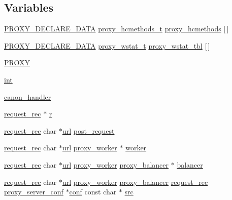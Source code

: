 \subsection*{Variables}
\begin{DoxyCompactItemize}
\item 
\hyperlink{group__MOD__PROXY_ga0446e2d44d50898071a7dcb4fd9172b0}{P\+R\+O\+X\+Y\+\_\+\+D\+E\+C\+L\+A\+R\+E\+\_\+\+D\+A\+TA} \hyperlink{structproxy__hcmethods__t}{proxy\+\_\+hcmethods\+\_\+t} \hyperlink{group__MOD__PROXY_gaaf461fe67b2fa7c8dd2f5ed1313fe46f}{proxy\+\_\+hcmethods} \mbox{[}$\,$\mbox{]}
\item 
\hyperlink{group__MOD__PROXY_ga0446e2d44d50898071a7dcb4fd9172b0}{P\+R\+O\+X\+Y\+\_\+\+D\+E\+C\+L\+A\+R\+E\+\_\+\+D\+A\+TA} \hyperlink{structproxy__wstat__t}{proxy\+\_\+wstat\+\_\+t} \hyperlink{group__MOD__PROXY_ga1077b97180eb36b606215d0625e0cfa0}{proxy\+\_\+wstat\+\_\+tbl} \mbox{[}$\,$\mbox{]}
\item 
\hyperlink{group__MOD__PROXY_ga8a2d0523d70a5ec877fe8d89ef4ecd96}{P\+R\+O\+XY}
\item 
\hyperlink{group__MOD__PROXY_ga1737d9ec131b6c1a095e69a2a6e95f41}{int}
\item 
\hyperlink{group__MOD__PROXY_gae1b959459c672856e6ddbe5c4516c7f0}{canon\+\_\+handler}
\item 
\hyperlink{structrequest__rec}{request\+\_\+rec} $\ast$ \hyperlink{group__MOD__PROXY_gac68e921ed15f71060d618adb662a84f6}{r}
\item 
\hyperlink{structrequest__rec}{request\+\_\+rec} char $\ast$\hyperlink{group__APR__Util__Escaping_gaec657bef26e5ff27b9442563a591d9ec}{url} \hyperlink{group__MOD__PROXY_ga16dfddd69e577bde0530baf5fb180cc2}{post\+\_\+request}
\item 
\hyperlink{structrequest__rec}{request\+\_\+rec} char $\ast$\hyperlink{group__APR__Util__Escaping_gaec657bef26e5ff27b9442563a591d9ec}{url} \hyperlink{structproxy__worker}{proxy\+\_\+worker} $\ast$ \hyperlink{group__MOD__PROXY_gad62a732febc2b789c7a84e2fdb3c5aa8}{worker}
\item 
\hyperlink{structrequest__rec}{request\+\_\+rec} char $\ast$\hyperlink{group__APR__Util__Escaping_gaec657bef26e5ff27b9442563a591d9ec}{url} \hyperlink{structproxy__worker}{proxy\+\_\+worker} \hyperlink{structproxy__balancer}{proxy\+\_\+balancer} $\ast$ \hyperlink{group__MOD__PROXY_ga7d902f564a33cf9c787a5670b026737b}{balancer}
\item 
\hyperlink{structrequest__rec}{request\+\_\+rec} char $\ast$\hyperlink{group__APR__Util__Escaping_gaec657bef26e5ff27b9442563a591d9ec}{url} \hyperlink{structproxy__worker}{proxy\+\_\+worker} \hyperlink{structproxy__balancer}{proxy\+\_\+balancer} \hyperlink{structrequest__rec}{request\+\_\+rec} \hyperlink{structproxy__server__conf}{proxy\+\_\+server\+\_\+conf} $\ast$\hyperlink{group__MOD__PROXY_ga4d7edd451c4bb8ed9ce9012e5dea2b14}{conf} const char $\ast$ \hyperlink{group__MOD__PROXY_ga750c51ef9d038414a4cb0467d7ac4c2a}{src}

\end{DoxyCompactItemize}
